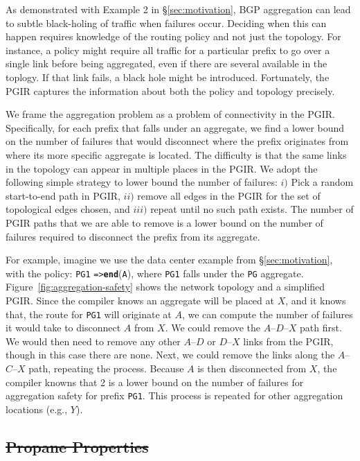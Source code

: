 \documentclass{sig-alternate-10pt}
\newcommand{\CD}[1]{\texttt{\small #1}}  %
\newcommand{\KW}[1]{\texttt{\small\bfseries{#1}}}
\newcommand{\Path}{\texttt{=>}}
\newcommand{\End}{\KW{end}}
\providecommand{\DIFdel}[1]{{\protect\color{red}\sout{#1}}}                      %
\providecommand{\DIFdelbegin}{} %
\begin{document}
As demonstrated with Example 2 in \S\ref{sec:motivation}, BGP aggregation can lead to subtle black-holing of traffic when failures occur. Deciding when this can happen requires knowledge of the routing policy and not just the topology. For instance, a policy might require all traffic for a particular prefix to go over a single link before being aggregated, even if there are several available in the toplogy. If that link fails, a black hole might be introduced. Fortunately, the PGIR captures the information about both the policy and topology precisely.

We frame the aggregation problem as a problem of connectivity in the PGIR. Specifically, for each prefix that falls under an aggregate, we find a lower bound on the number of failures that would disconnect where the prefix originates from where its more specific aggregate is located. The difficulty is that the same links in the topology can appear in multiple places in the PGIR. We adopt the following simple strategy to lower bound the number of failures: $i)$ Pick a random start-to-end path in PGIR, $ii)$ remove all edges in the PGIR for the set of topological edges chosen, and $iii)$ repeat until no such path exists.
The number of PGIR paths that we are able to remove is a lower bound on the number of failures required to disconnect the prefix from its aggregate. 

For example, imagine we use the data center example from \S\ref{sec:motivation}, with the policy: 
\CD{PG1} \Path \text{ }\End(\CD{A}), where \CD{PG1} falls under the \CD{PG} aggregate. Figure~\ref{fig:aggregation-safety} shows the network topology and a simplified PGIR. Since the compiler knows an aggregate will be placed at $X$, and it knows that, the route for \CD{PG1} will originate at $A$, we can compute the number of failures it would take to disconnect $A$ from $X$. We could remove the $A$--$D$--$X$ path first. We would then need to remove any other $A$--$D$ or $D$--$X$ links from the PGIR, though in this case there are none. Next, we could remove the links along the $A$--$C$--$X$ path, repeating the process. Because $A$ is then disconnected from $X$, the compiler knowns that 2 is a lower bound on the number of failures for aggregation safety for prefix \CD{PG1}. This process is repeated for other aggregation locations (e.g., $Y$).


\DIFdelbegin \subsection{\DIFdel{Propane Properties}}
\addtocounter{subsection}{-1}%
\end{document}
